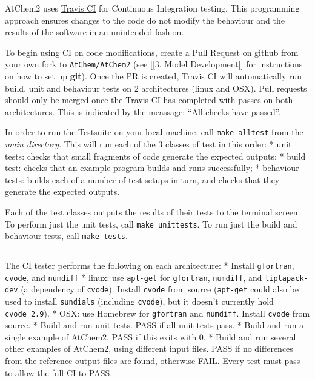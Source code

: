 AtChem2 uses \href{https://travis-ci.org/}{Travis CI} for Continuous
Integration testing. This programming approach ensures changes to the
code do not modify the behaviour and the results of the software in an
unintended fashion.

To begin using CI on code modifications, create a Pull Request on github
from your own fork to \texttt{AtChem/AtChem2} (see {[}{[}3. Model
Development{]}{]} for instructions on how to set up \textbf{git}). Once
the PR is created, Travis CI will automatically run build, unit and
behaviour tests on 2 architectures (linux and OSX). Pull requests should
only be merged once the Travis CI has completed with passes on both
architectures. This is indicated by the meassage: ``All checks have
passed''.

In order to run the Testsuite on your local machine, call
\texttt{make\ alltest} from the \emph{main directory}. This will run
each of the 3 classes of test in this order: * unit tests: checks that
small fragments of code generate the expected outputs; * build test:
checks that an example program builds and runs successfully; * behaviour
tests: builds each of a number of test setups in turn, and checks that
they generate the expected outputs.

Each of the test classes outputs the results of their tests to the
terminal screen. To perform just the unit tests, call
\texttt{make\ unittests}. To run just the build and behaviour tests,
call \texttt{make\ tests}.

\begin{center}\rule{0.5\linewidth}{\linethickness}\end{center}

The CI tester performs the following on each architecture: * Install
\texttt{gfortran}, \texttt{cvode}, and \texttt{numdiff} * linux: use
\texttt{apt-get} for \texttt{gfortran}, \texttt{numdiff}, and
\texttt{liplapack-dev} (a dependency of \texttt{cvode}). Install
\texttt{cvode} from source (\texttt{apt-get} could also be used to
install \texttt{sundials} (including \texttt{cvode}), but it doesn't
currently hold \texttt{cvode\ 2.9}). * OSX: use Homebrew for
\texttt{gfortran} and \texttt{numdiff}. Install \texttt{cvode} from
source. * Build and run unit tests. PASS if all unit tests pass. * Build
and run a single example of AtChem2. PASS if this exits with 0. * Build
and run several other examples of AtChem2, using different input files.
PASS if no differences from the reference output files are found,
otherwise FAIL. Every test must pass to allow the full CI to PASS.

